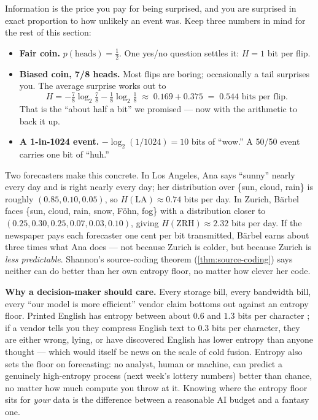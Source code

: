 \begin{intuition}
Information is the price you pay for being surprised, and you are
surprised in exact proportion to how unlikely an event was. Keep
three numbers in mind for the rest of this section:

\begin{itemize}[leftmargin=2em,itemsep=1pt]
  \item \textbf{Fair coin.} $p(\text{heads}) = \tfrac12$. One yes/no
    question settles it: $H = 1$ bit per flip.
  \item \textbf{Biased coin, 7/8 heads.} Most flips are boring;
    occasionally a tail surprises you. The average surprise works out
    to
    \[
      H = -\tfrac78\log_2\tfrac78 - \tfrac18\log_2\tfrac18
        \;\approx\; 0.169 + 0.375 \;=\; 0.544 \text{ bits per flip}.
    \]
    That is the ``about half a bit'' we promised --- now with the
    arithmetic to back it up.
  \item \textbf{A 1-in-1024 event.} $-\log_2(1/1024) = 10$ bits of
    ``wow.'' A 50/50 event carries one bit of ``huh.''
\end{itemize}

Two forecasters make this concrete. In Los Angeles, Ana says
``sunny'' nearly every day and is right nearly every day; her
distribution over \{sun, cloud, rain\} is roughly
$(0.85, 0.10, 0.05)$, so $H(\text{LA}) \approx 0.74$ bits per day.
In Zurich, B\"arbel faces \{sun, cloud, rain, snow, F\"{o}hn, fog\}
with a distribution closer to $(0.25, 0.30, 0.25, 0.07, 0.03, 0.10)$,
giving $H(\text{ZRH}) \approx 2.32$ bits per day. If the newspaper
pays each forecaster one cent per bit transmitted, B\"arbel earns
about three times what Ana does --- not because Zurich is colder,
but because Zurich is \emph{less predictable}. Shannon's
source-coding theorem (\cref{thm:source-coding}) says neither can do
better than her own entropy floor, no matter how clever her code.

\textbf{Why a decision-maker should care.} Every storage bill, every
bandwidth bill, every ``our model is more efficient'' vendor claim
bottoms out against an entropy floor. Printed English has entropy
between about $0.6$ and $1.3$ bits per character \citep[Ch.~6]{coverthomas2006};
if a vendor tells you they compress English text to $0.3$ bits per
character, they are either wrong, lying, or have discovered English
has lower entropy than anyone thought --- which would itself be news
on the scale of cold fusion. Entropy also sets the floor on
forecasting: no analyst, human or machine, can predict a genuinely
high-entropy process (next week's lottery numbers) better than
chance, no matter how much compute you throw at it. Knowing where
the entropy floor sits for \emph{your} data is the difference
between a reasonable AI budget and a fantasy one.
\end{intuition}

